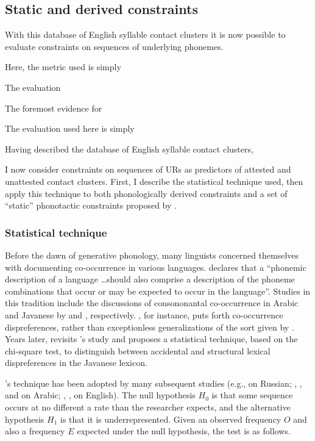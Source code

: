 \subsection{Static and derived constraints}

With this database of English syllable contact clusters it is now possible to evaluate constraints on sequences of underlying phonemes. 


Here, the metric used is simply 

The evaluation 

The foremost evidence for 


The evaluation used here is simply 

Having described the database of English syllable contact clusters, 



I now consider constraints on sequences of URs as predictors of attested and unattested contact clusters. First, I describe the statistical technique used, then apply this technique to both phonologically derived constraints and a set of ``static'' phonotactic constraints proposed by \citet{Pierrehumbert1994}. 

\subsubsection{Statistical technique}
\label{stattech}

Before the dawn of generative phonology, many linguists concerned themselves with documenting co-occurrence in various languages. \citet[][28]{Vogt1954} declares that a ``phonemic description of a language \ldots should also comprise a description of the phoneme combinations that occur or may be expected to occur in the language''. Studies in this tradition include the discussions of consononantal co-occurrence in Arabic and Javanese by \citet{Greenberg1950} and \citet{Uhlenbeck1950}, respectively. \citeauthor{Uhlenbeck1950}, for instance, puts forth co-occurrence dispreferences, rather than exceptionless generalizations of the sort given by \citet{Greenberg1950}. Years later, \citet{Mester1988} revisits \citeauthor{Uhlenbeck1950}'s study and proposes a statistical technique, based on the chi-square test, to distinguish between accidental and structural lexical dispreferences in the Javanese lexicon. 

\citeauthor{Mester1988}'s technique has been adopted by many subsequent studies (e.g., \citealt{Padgett1992,Padgett1995} on Russian; \citealt{Pierrehumbert1993}, \citealt{Frisch1996}, and \citealt{Frisch2004} on Arabic; \citealt{Berkley1994b,Berkley1994a,Berkley2000}, \citealt{Dmitrieva2008a}, \citealt{Dmitrieva2008b} on English). The null hypothesis $H_0$ is that some sequence occurs at no different a rate than the researcher expects, and the alternative hypothesis $H_1$ is that it is underrepresented. Given an observed frequency $O$ and also a frequency $E$ expected under the null hypothesis, the test is as follows.

